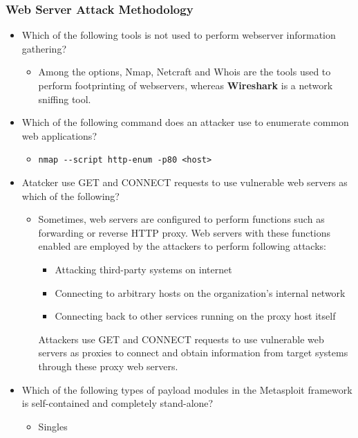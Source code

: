 \subsubsection{Web Server Attack Methodology}
\begin{itemize}
    \item Which of the following tools is not used to perform webserver information gathering?
    \begin{itemize}
        \item Among the options, Nmap, Netcraft and Whois are the tools used to perform footprinting of webservers, whereas \textbf{Wireshark} is a network sniffing tool.
    \end{itemize}
    \item Which of the following command does an attacker use to enumerate common web applications?
    \begin{itemize}
        \item \verb|nmap --script http-enum -p80 <host>|
    \end{itemize}
    \item Atatcker use GET and CONNECT requests to use vulnerable web servers as which of the following?
    \begin{itemize}
        \item Sometimes, web servers are configured to perform functions such as forwarding or reverse HTTP proxy. Web servers with these functions enabled are employed by the attackers to perform following attacks:
        \begin{itemize}
            \item Attacking third-party systems on internet
            \item Connecting to arbitrary hosts on the organization's internal network
            \item Connecting back to other services running on the proxy host itself
        \end{itemize}
        Attackers use GET and CONNECT requests to use vulnerable web servers as proxies to connect and obtain information from target systems through these proxy web servers.
    \end{itemize}
    \item Which of the following types of payload modules in the Metasploit framework is self-contained and completely stand-alone?
    \begin{itemize}
        \item Singles
    \end{itemize}
\end{itemize}
